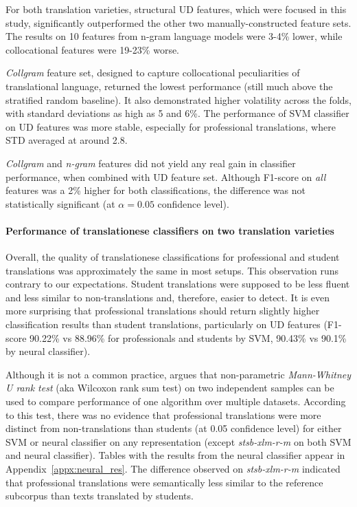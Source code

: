 For both translation varieties, structural UD features, which were focused in this study, significantly outperformed the other two manually-constructed feature sets. The results on 10 features from n-gram language models were 3-4\% lower, while collocational features were 19-23\% worse. 

\textit{Collgram} feature set, designed to capture collocational peculiarities of translational language, returned the lowest performance (still much above the stratified random baseline). It also demonstrated higher volatility across the folds, with standard deviations as high as 5 and 6\%. The performance of SVM classifier on UD features was more stable, especially for professional translations, where STD averaged at around 2.8. 

\textit{Collgram} and \textit{n-gram} features did not yield any real gain in classifier performance, when combined with UD feature set. Although F1-score on \textit{all} features was a 2\% higher for both classifications, the difference was not statistically significant (at $\alpha=0.05$ confidence level).


\paragraph{Performance of translationese classifiers on two translation varieties}
Overall, the quality of translationese classifications for professional and student translations was approximately the same in most setups. This observation runs contrary to our expectations. Student translations were supposed to be less fluent and less similar to non-translations and, therefore, easier to detect. 
It is even more surprising that professional translations should return slightly higher classification results than student translations, particularly on UD features (F1-score 90.22\% vs 88.96\% for professionals and students by SVM, 90.43\% vs 90.1\% by neural classifier).

Although it is not a common practice, \citet{Demvsar2006} argues that non-parametric \textit{Mann-Whitney U rank test} (aka Wilcoxon rank sum test) on two independent samples can be used to compare performance of one algorithm over multiple datasets. 
According to this test, there was no evidence that professional translations were more distinct from non-translations than students (at 0.05 confidence level) for either SVM or neural classifier on any representation (except \textit{stsb-xlm-r-m} on both SVM and neural classifier). Tables with the results from the neural classifier appear in Appendix~\ref{appx:neural_res}.
The difference observed on \textit{stsb-xlm-r-m} indicated that professional translations were semantically less similar to the reference subcorpus than texts translated by students.

